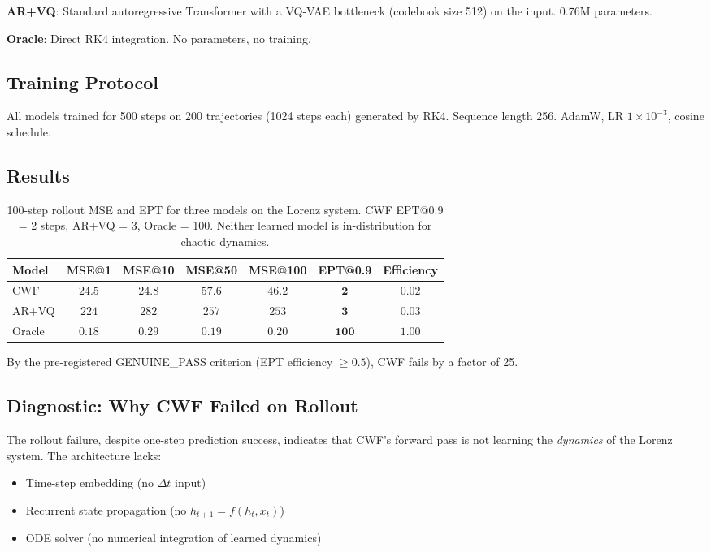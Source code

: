 \documentclass{article}
\begin{document}
\textbf{AR+VQ}: Standard autoregressive Transformer with a VQ-VAE bottleneck (codebook size 512) on the input. 0.76M parameters.

\textbf{Oracle}: Direct RK4 integration. No parameters, no training.

\subsection{Training Protocol}

All models trained for 500 steps on 200 trajectories (1024 steps each) generated by RK4. Sequence length 256. AdamW, LR $1 \times 10^{-3}$, cosine schedule.

\subsection{Results}

\begin{table}[h]
\centering
\small
\begin{tabular}{lcccccc}
\toprule
Model & MSE@1 & MSE@10 & MSE@50 & MSE@100 & EPT@0.9 & Efficiency \\
\midrule
CWF & $24.5$ & $24.8$ & $57.6$ & $46.2$ & $\mathbf{2}$ & $0.02$ \\
AR+VQ & $224$ & $282$ & $257$ & $253$ & $\mathbf{3}$ & $0.03$ \\
Oracle & $0.18$ & $0.29$ & $0.19$ & $0.20$ & $\mathbf{100}$ & $1.00$ \\
\bottomrule
\end{tabular}
\caption{100-step rollout MSE and EPT for three models on the Lorenz system. CWF EPT@0.9 = 2 steps, AR+VQ = 3, Oracle = 100. Neither learned model is in-distribution for chaotic dynamics.}
\label{tab:lorenz}
\end{table}

By the pre-registered GENUINE\_PASS criterion (EPT efficiency $\geq 0.5$), CWF fails by a factor of 25.

\subsection{Diagnostic: Why CWF Failed on Rollout}

The rollout failure, despite one-step prediction success, indicates that CWF's forward pass is not learning the \emph{dynamics} of the Lorenz system. The architecture lacks:

\begin{itemize}
    \item Time-step embedding (no $\Delta t$ input)
    \item Recurrent state propagation (no $h_{t+1} = f(h_t, x_t)$)
    \item ODE solver (no numerical integration of learned dynamics)
\end{itemize}
\end{document}
